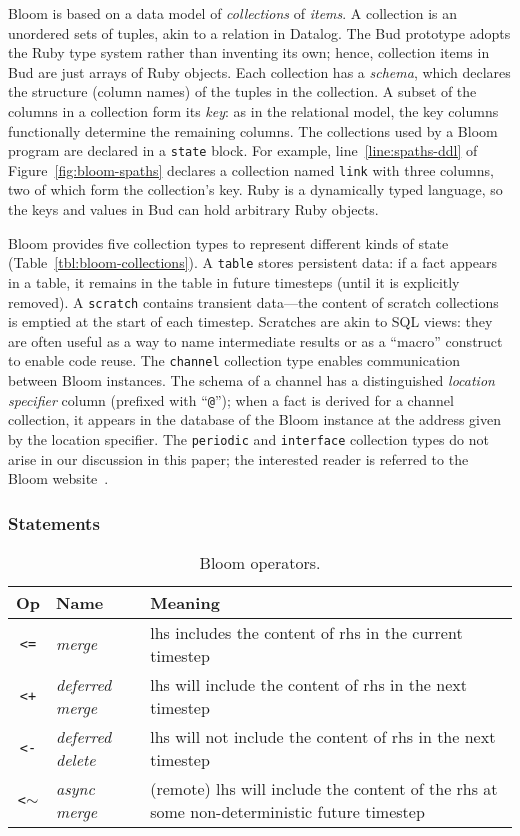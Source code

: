 Bloom is based on a data model of \emph{collections} of {\em items}.  A
collection is an unordered sets of tuples, akin to a relation in Datalog. The
Bud prototype adopts the Ruby type system rather than inventing its own; hence,
collection items in Bud are just arrays of Ruby objects. Each collection has a
\emph{schema}, which declares the structure (column names) of the tuples in the
collection. A subset of the columns in a collection form its \emph{key}: as in
the relational model, the key columns functionally determine the remaining
columns. The collections used by a Bloom program are declared in a
\texttt{state} block. For example, line~\ref{line:spaths-ddl} of
Figure~\ref{fig:bloom-spaths} declares a collection named \texttt{link} with
three columns, two of which form the collection's key. Ruby is a dynamically
typed language, so the keys and values in Bud can hold arbitrary Ruby objects.

Bloom provides five collection types to represent different kinds of state
(Table~\ref{tbl:bloom-collections}). A \texttt{table} stores persistent data: if
a fact appears in a table, it remains in the table in future timesteps (until it
is explicitly removed). A \texttt{scratch} contains transient data---the content
of scratch collections is emptied at the start of each timestep. Scratches are
akin to SQL views: they are often useful as a way to name intermediate results
or as a ``macro'' construct to enable code reuse. The \texttt{channel}
collection type enables communication between Bloom instances. The schema of a
channel has a distinguished \emph{location specifier} column (prefixed with
``\texttt{@}''); when a fact is derived for a channel collection, it appears in
the database of the Bloom instance at the address given by the location
specifier. The \texttt{periodic} and \texttt{interface} collection types do not
arise in our discussion in this paper; the interested reader is referred to the
Bloom website~\cite{bloom}.

\subsubsection{Statements}
\begin{table}
\begin{tabular}{|c|l|p{1.85in}|}
\hline
\textbf{Op} & \textbf{Name} & \textbf{Meaning} \\
\hline
\verb|<=| & \emph{merge} & lhs includes the content of rhs in the
current timestep \\
\hline
\verb|<+| & \emph{deferred merge} & lhs will include the content of rhs in the
next timestep \\
\hline
\verb|<-| & \emph{deferred delete} & lhs will not include the content of rhs
in the next timestep \\
\hline
\verb|<|$\sim$ & \emph{async merge} & (remote) lhs will include the content of the
rhs at some non-deterministic future timestep\\
\hline
\end{tabular}
\caption{Bloom operators.}
\label{tbl:bloom-ops}
\end{table}

